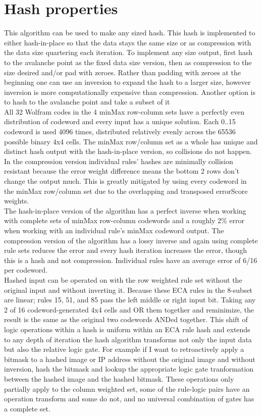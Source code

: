 \documentclass[11pt]{article}
\begin{document}
\section{Hash properties}

This algorithm can be used to make any sized hash. This hash is implemented to either hash-in-place so that the data stays the same size or as compression with the data size quartering each iteration. To implement any size output, first hash to the avalanche point as the fixed data size version, then as compression to the size desired and/or pad with zeroes. Rather than padding with zeroes at the beginning one can use an inversion to expand the hash to a larger size, however inversion is more computationally expensive than compression. Another option is to hash to the avalanche point and take a subset of it\\

All 32 Wolfram codes in the 4 minMax row-column sets have a perfectly even distribution of codeword and every input has a unique solution. Each 0..15 codeword is used 4096 times, distributed relatively evenly across the 65536 possible binary 4x4 cells. The minMax row/column set as a whole has unique and distinct hash output with the hash-in-place version, so collisions do not happen. In the compression version individual rules' hashes are minimally collision resistant because the error weight difference means the bottom 2 rows don't change the output much. This is greatly mitigated by using every codeword in the minMax row/column set due to the overlapping and transposed errorScore weights.\\

The hash-in-place version of the algorithm has a perfect inverse when working with complete sets of minMax row-column codewords and a roughly 2\% error when working with an individual rule's minMax codeword output. The compression version of the algorithm has a lossy inverse and again using complete rule sets reduces the error and every hash iteration increases the error, though this is a hash and not compression. Individual rules have an average error of 6/16 per codeword.\\

Hashed input can be operated on with the row weighted rule set without the original input and without inverting it. Because these ECA rules in the 8-subset are linear; rules 15, 51, and 85 pass the left middle or right input bit. Taking any 2 of 16 codeword-generated 4x4 cells and OR them together and reminimize, the result is the same as the original two codewords ANDed together.  This shift of logic operations within a hash is uniform within an ECA rule hash and extends to any depth of iteration the hash algorithm transforms not only the input data but also the relative logic gate. For example if I want to retroactively apply a bitmask to a hashed image or IP address without the original image and without inversion, hash the bitmask and lookup the appropriate logic gate tranformation between the hashed image and the hashed bitmask. These operations only partially apply to the column weighted set, some of the rule-logic pairs have an operation transform and some do not, and no universal combination of gates has a complete set. \\
\end{document}
